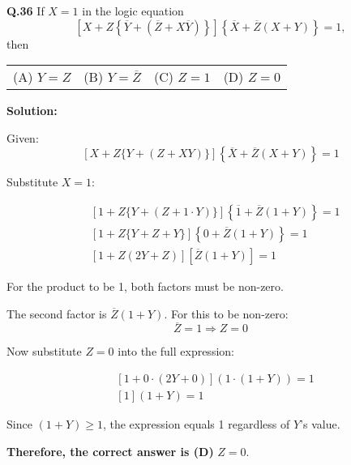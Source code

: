\documentclass{article}
\begin{document}
\noindent\textbf{Q.36} 
{If \( X = 1 \) in the logic equation\[\left[ X + Z \left\{ \overline{Y} + \left( \overline{Z} + X \overline{Y} \right) \right\} \right]
\left\{ \overline{X} + \overline{Z}(X + Y) \right\} = 1,
\]then}

\vspace{0.5em}

\noindent
\begin{tabular}{llll}
(A) \( Y = Z \) & (B) \( Y = \overline{Z} \) & (C) \( Z = 1 \) & (D) \( Z = 0 \)
\end{tabular}

\vspace{1em}
\noindent\textbf{Solution:}

Given:
\[
\left[X + Z\{Y + (Z + XY)\}\right]\left\{\overline{X} + \overline{Z}(X + Y)\right\} = 1
\]

Substitute \( X = 1 \):

\begin{align*}
&\left[1 + Z\{Y + (Z + 1 \cdot Y)\}\right]\left\{\overline{1} + \overline{Z}(1 + Y)\right\} = 1 \\
&\left[1 + Z\{Y + Z + Y\}\right]\left\{0 + \overline{Z}(1 + Y)\right\} = 1 \\
&\left[1 + Z(2Y + Z)\right]\left[\overline{Z}(1 + Y)\right] = 1
\end{align*}

For the product to be 1, both factors must be non-zero.

\noindent The second factor is \(\overline{Z}(1 + Y)\). For this to be non-zero:
\[
\overline{Z} = 1 \Rightarrow Z = 0
\]

Now substitute \( Z = 0 \) into the full expression:

\begin{align*}
&\left[1 + 0\cdot(2Y + 0)\right](1 \cdot (1 + Y)) = 1 \\
&[1](1 + Y) = 1
\end{align*}

\noindent Since \( (1 + Y) \geq 1 \), the expression equals 1 regardless of \( Y \)'s value.

\noindent\textbf{Therefore, the correct answer is (D) } \( Z = 0 \).
\end{document}
